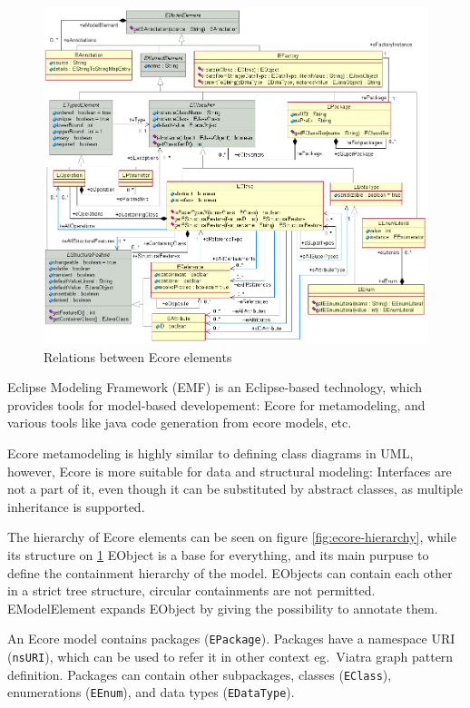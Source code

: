 \begin{figure}
	\begin{center}
		\includegraphics[width=\textwidth]{figures/EcoreRelations.png}
		\caption{Relations between Ecore elements \cite{ecore-package} }
		\label{fig:ecore-relations}
	\end{center}
\end{figure}

Eclipse Modeling Framework (EMF) is an Eclipse-based technology, which provides tools for model-based developement: 
Ecore \cite{ecore-package} for metamodeling, and various tools like java code generation from ecore models, etc.

Ecore metamodeling is highly similar to defining class diagrams in UML, however, 
Ecore is more suitable for data and structural modeling: Interfaces are not a part of it, even though it can be substituted by abstract classes, as multiple inheritance is supported.

The hierarchy of Ecore elements can be seen on figure \ref{fig:ecore-hierarchy}, while its structure on \ref{fig:ecore-relations}
EObject is a base for everything, and its main purpuse to define the containment hierarchy of the model. 
EObjects can contain each other in a strict tree structure, circular containments are not permitted.
EModelElement expands EObject by giving the possibility to annotate them.

An Ecore model contains packages (\texttt{EPackage}). 
Packages have a namespace URI (\texttt{nsURI}), which can be used to refer it in other context eg.\ Viatra graph pattern definition.
Packages can contain other subpackages, classes (\texttt{EClass}), enumerations (\texttt{EEnum}), and data types (\texttt{EDataType}).

